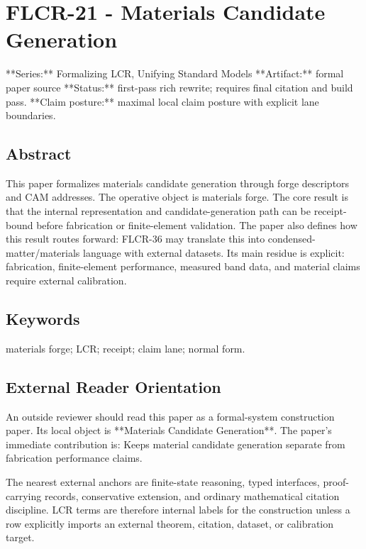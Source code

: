 \documentclass[11pt]{article}
\begin{document}
\section*{FLCR-21 - Materials Candidate Generation}

**Series:** Formalizing LCR, Unifying Standard Models
**Artifact:** formal paper source
**Status:** first-pass rich rewrite; requires final citation and build pass.
**Claim posture:** maximal local claim posture with explicit lane boundaries.

\subsection*{Abstract}

This paper formalizes materials candidate generation through forge descriptors and CAM addresses. The operative object is materials forge. The core result is that the internal representation and candidate-generation path can be receipt-bound before fabrication or finite-element validation. The paper also defines how this result routes forward: FLCR-36 may translate this into condensed-matter/materials language with external datasets. Its main residue is explicit: fabrication, finite-element performance, measured band data, and material claims require external calibration.

\subsection*{Keywords}

materials forge; LCR; receipt; claim lane; normal form.

\subsection*{External Reader Orientation}

An outside reviewer should read this paper as a formal-system construction paper. Its local object is **Materials Candidate Generation**. The paper's immediate contribution is: Keeps material candidate generation separate from fabrication performance claims.

The nearest external anchors are finite-state reasoning, typed interfaces, proof-carrying records, conservative extension, and ordinary mathematical citation discipline. LCR terms are therefore internal labels for the construction unless a row explicitly imports an external theorem, citation, dataset, or calibration target.
\end{document}
